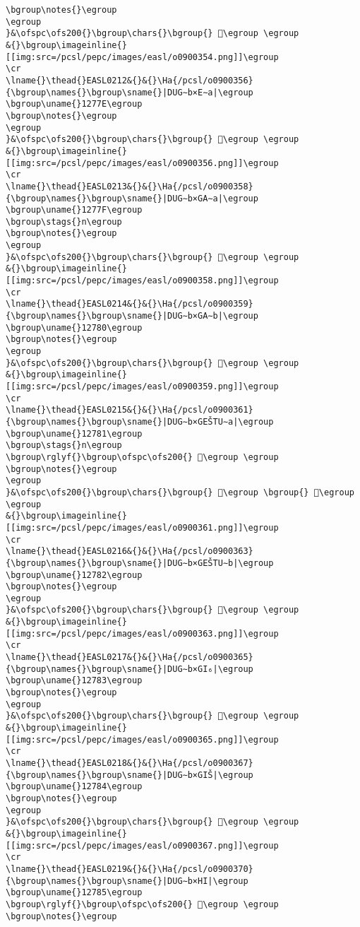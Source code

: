 \begin{verbatim}
\bgroup\notes{}\egroup
\egroup
}&\ofspc\ofs200{}\bgroup\chars{}\bgroup{} 𒝽\egroup \egroup
&{}\bgroup\imageinline{}[[img:src=/pcsl/pepc/images/easl/o0900354.png]]\egroup
\cr
\lname{}\thead{}EASL0212&{}&{}\Ha{/pcsl/o0900356}{\bgroup\names{}\bgroup\sname{}|DUG∼b×E∼a|\egroup
\bgroup\uname{}1277E\egroup
\bgroup\notes{}\egroup
\egroup
}&\ofspc\ofs200{}\bgroup\chars{}\bgroup{} 𒝾\egroup \egroup
&{}\bgroup\imageinline{}[[img:src=/pcsl/pepc/images/easl/o0900356.png]]\egroup
\cr
\lname{}\thead{}EASL0213&{}&{}\Ha{/pcsl/o0900358}{\bgroup\names{}\bgroup\sname{}|DUG∼b×GA∼a|\egroup
\bgroup\uname{}1277F\egroup
\bgroup\stags{}n\egroup
\bgroup\notes{}\egroup
\egroup
}&\ofspc\ofs200{}\bgroup\chars{}\bgroup{} 𒝿\egroup \egroup
&{}\bgroup\imageinline{}[[img:src=/pcsl/pepc/images/easl/o0900358.png]]\egroup
\cr
\lname{}\thead{}EASL0214&{}&{}\Ha{/pcsl/o0900359}{\bgroup\names{}\bgroup\sname{}|DUG∼b×GA∼b|\egroup
\bgroup\uname{}12780\egroup
\bgroup\notes{}\egroup
\egroup
}&\ofspc\ofs200{}\bgroup\chars{}\bgroup{} 𒞀\egroup \egroup
&{}\bgroup\imageinline{}[[img:src=/pcsl/pepc/images/easl/o0900359.png]]\egroup
\cr
\lname{}\thead{}EASL0215&{}&{}\Ha{/pcsl/o0900361}{\bgroup\names{}\bgroup\sname{}|DUG∼b×GEŠTU∼a|\egroup
\bgroup\uname{}12781\egroup
\bgroup\stags{}n\egroup
\bgroup\rglyf{}\bgroup\ofspc\ofs200{} 𒞁\egroup \egroup
\bgroup\notes{}\egroup
\egroup
}&\ofspc\ofs200{}\bgroup\chars{}\bgroup{} 𒞰\egroup \bgroup{} 𒞁\egroup \egroup
&{}\bgroup\imageinline{}[[img:src=/pcsl/pepc/images/easl/o0900361.png]]\egroup
\cr
\lname{}\thead{}EASL0216&{}&{}\Ha{/pcsl/o0900363}{\bgroup\names{}\bgroup\sname{}|DUG∼b×GEŠTU∼b|\egroup
\bgroup\uname{}12782\egroup
\bgroup\notes{}\egroup
\egroup
}&\ofspc\ofs200{}\bgroup\chars{}\bgroup{} 𒞂\egroup \egroup
&{}\bgroup\imageinline{}[[img:src=/pcsl/pepc/images/easl/o0900363.png]]\egroup
\cr
\lname{}\thead{}EASL0217&{}&{}\Ha{/pcsl/o0900365}{\bgroup\names{}\bgroup\sname{}|DUG∼b×GI₆|\egroup
\bgroup\uname{}12783\egroup
\bgroup\notes{}\egroup
\egroup
}&\ofspc\ofs200{}\bgroup\chars{}\bgroup{} 𒞃\egroup \egroup
&{}\bgroup\imageinline{}[[img:src=/pcsl/pepc/images/easl/o0900365.png]]\egroup
\cr
\lname{}\thead{}EASL0218&{}&{}\Ha{/pcsl/o0900367}{\bgroup\names{}\bgroup\sname{}|DUG∼b×GIŠ|\egroup
\bgroup\uname{}12784\egroup
\bgroup\notes{}\egroup
\egroup
}&\ofspc\ofs200{}\bgroup\chars{}\bgroup{} 𒞄\egroup \egroup
&{}\bgroup\imageinline{}[[img:src=/pcsl/pepc/images/easl/o0900367.png]]\egroup
\cr
\lname{}\thead{}EASL0219&{}&{}\Ha{/pcsl/o0900370}{\bgroup\names{}\bgroup\sname{}|DUG∼b×HI|\egroup
\bgroup\uname{}12785\egroup
\bgroup\rglyf{}\bgroup\ofspc\ofs200{} 𒞅\egroup \egroup
\bgroup\notes{}\egroup

\end{verbatim}
